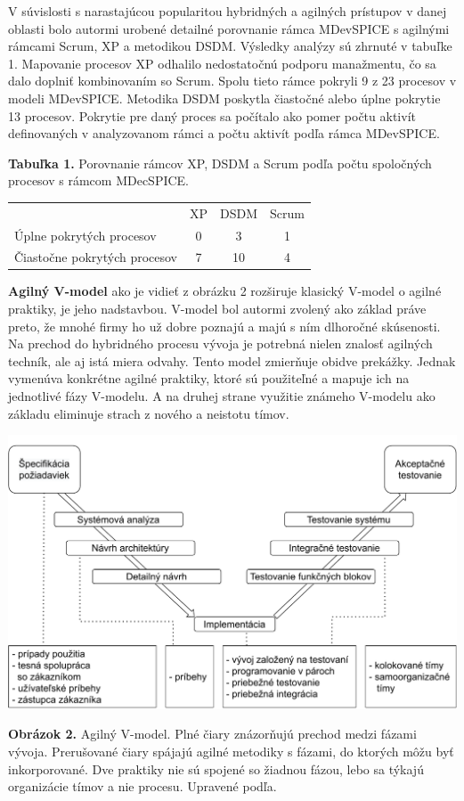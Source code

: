 \documentclass[10pt,twoside,slovak,a4paper]{article}
\begin{document}
V súvislosti s narastajúcou popularitou hybridných a agilných prístupov v danej oblasti bolo autormi urobené detailné porovnanie rámca MDevSPICE s agilnými rámcami Scrum, XP a metodikou DSDM. Výsledky analýzy sú zhrnuté v tabuľke 1. Mapovanie procesov XP odhalilo nedostatočnú podporu manažmentu, čo sa dalo doplniť kombinovaním so Scrum. Spolu tieto rámce pokryli 9 z 23 procesov v modeli MDevSPICE. Metodika DSDM poskytla čiastočné alebo úplne pokrytie 13 procesov. Pokrytie pre daný proces sa počítalo ako pomer počtu aktivít definovaných v analyzovanom rámci a počtu aktivít podľa rámca MDevSPICE\cite{mccaffery2019}. 
\medskip

\noindent\textbf{Tabuľka 1.} Porovnanie rámcov XP, DSDM a Scrum podľa počtu spoločných procesov s rámcom MDecSPICE.
\begin{table}[h!]
\centering
\begin{tabular}{l|c|c|c|}
 & XP & DSDM & Scrum \\
Úplne pokrytých procesov     & 0  & 3    & 1 \\
Čiastočne pokrytých procesov & 7  & 10   & 4 \\
\end{tabular}
\end{table}
\medskip

\textbf{Agilný V-model} ako je vidieť z obrázku 2 rozširuje klasický V-model o agilné praktiky, je jeho nadstavbou. V-model bol autormi zvolený ako základ práve preto, že mnohé firmy ho už dobre poznajú a majú s ním dlhoročné skúsenosti. Na prechod do hybridného procesu vývoja je potrebná nielen znalosť agilných techník, ale aj istá miera odvahy. Tento model zmierňuje obidve prekážky. Jednak vymenúva konkrétne agilné praktiky, ktoré sú použiteľné a mapuje ich na jednotlivé fázy V-modelu. A na druhej strane využitie známeho V-modelu ako základu eliminuje strach z nového a neistotu tímov\cite{mchugh2013}.

\begin{center}
\includegraphics[scale=0.5]{avmodel.pdf}
\end{center}
\textbf{Obrázok 2.} Agilný V-model. Plné čiary znázorňujú prechod medzi fázami vývoja. Prerušované čiary spájajú agilné metodiky s fázami, do ktorých môžu byť inkorporované. Dve praktiky nie sú spojené so žiadnou fázou, lebo sa týkajú organizácie tímov a nie procesu. Upravené podľa\cite{mchugh2013}.
\medskip
\end{document}
